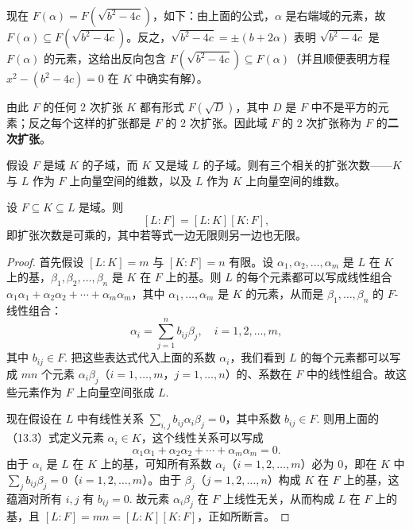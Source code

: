 现在 \(F(\alpha) = F(\sqrt{b^2-4c})\)，如下：由上面的公式，\(\alpha\) 是右端域的元素，故 \(F(\alpha) \subseteq F(\sqrt{b^2-4c})\)。反之，\(\sqrt{b^2-4c} = \pm(b+2\alpha)\) 表明 \(\sqrt{b^2-4c}\) 是 \(F(\alpha)\) 的元素，这给出反向包含 \(F(\sqrt{b^2-4c}) \subseteq F(\alpha)\)（并且顺便表明方程 \(x^2-(b^2-4c) = 0\) 在 \(K\) 中确实有解）。

由此 \(F\) 的任何 2 次扩张 \(K\) 都有形式 \(F(\sqrt{D})\)，其中 \(D\) 是 \(F\) 中不是平方的元素；反之每个这样的扩张都是 \(F\) 的 2 次扩张。因此域 \(F\) 的 2 次扩张称为 \(F\) 的\textbf{二次扩张}。

假设 \(F\) 是域 \(K\) 的子域，而 \(K\) 又是域 \(L\) 的子域。则有三个相关的扩张次数——\(K\) 与 \(L\) 作为 \(F\) 上向量空间的维数，以及 \(L\) 作为 \(K\) 上向量空间的维数。

\begin{theorem}\label{thm:13.14}
设 \(F \subseteq K \subseteq L\) 是域。则
\[
[L:F] = [L:K][K:F],
\]
即扩张次数是可乘的，其中若等式一边无限则另一边也无限。
\end{theorem}

\begin{proof}
首先假设 \([L:K] = m\) 与 \([K:F] = n\) 有限。设 \(\alpha_1, \alpha_2, \ldots, \alpha_m\) 是 \(L\) 在 \(K\) 上的基，\(\beta_1, \beta_2, \ldots, \beta_n\) 是 \(K\) 在 \(F\) 上的基。则 \(L\) 的每个元素都可以写成线性组合 \(\alpha_1\alpha_1+\alpha_2\alpha_2+\cdots+\alpha_m\alpha_m\)，其中 \(\alpha_1, \ldots, \alpha_m\) 是 \(K\) 的元素，从而是 \(\beta_1, \ldots, \beta_n\) 的 \(F\)-线性组合：
\begin{equation}
\alpha_i = \sum_{j=1}^n b_{ij}\beta_j, \quad i = 1, 2, \ldots, m, \tag{13.3}
\end{equation}
其中 \(b_{ij} \in F\). 把这些表达式代入上面的系数 \(\alpha_i\)，我们看到 \(L\) 的每个元素都可以写成 \(mn\) 个元素 \(\alpha_i\beta_j\)（\(i = 1, \ldots, m\)，\(j = 1, \ldots, n\)）的、系数在 \(F\) 中的线性组合。故这些元素作为 \(F\) 上向量空间张成 \(L\).

现在假设在 \(L\) 中有线性关系 \(\sum_{i,j}b_{ij}\alpha_i\beta_j = 0\)，其中系数 \(b_{ij} \in F\). 则用上面的（13.3）式定义元素 \(\alpha_i \in K\)，这个线性关系可以写成
\[
\alpha_1\alpha_1+\alpha_2\alpha_2+\cdots+\alpha_m\alpha_m = 0.
\]
由于 \(\alpha_i\) 是 \(L\) 在 \(K\) 上的基，可知所有系数 \(\alpha_i\)（\(i = 1, 2, \ldots, m\)）必为 0，即在 \(K\) 中 \(\sum_j b_{ij}\beta_j = 0\)（\(i = 1, 2, \ldots, m\)）。由于 \(\beta_j\)（\(j = 1, 2, \ldots, n\)）构成 \(K\) 在 \(F\) 上的基，这蕴涵对所有 \(i, j\) 有 \(b_{ij} = 0\). 故元素 \(\alpha_i\beta_j\) 在 \(F\) 上线性无关，从而构成 \(L\) 在 \(F\) 上的基，且 \([L:F] = mn = [L:K][K:F]\)，正如所断言。
\end{proof}

